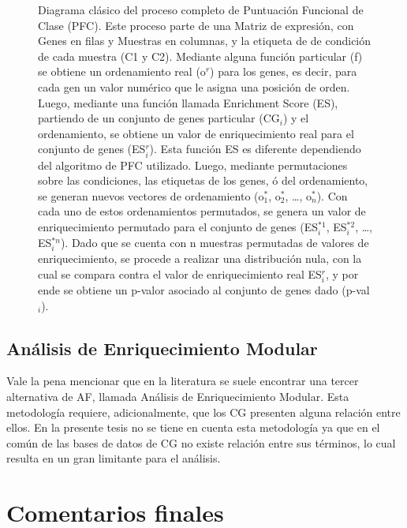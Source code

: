 \documentclass[12pt,twoside]{reedthesis}
\begin{document}
\begin{figure}
\caption{Diagrama clásico del proceso completo de Puntuación Funcional de Clase (PFC). Este proceso parte de una Matriz de expresión, con Genes en filas y Muestras en columnas, y la etiqueta de de condición de cada muestra (C1 y C2). Mediante alguna función particular (f) se obtiene un ordenamiento real (o\(^r\)) para los genes, es decir, para cada gen un valor numérico que le asigna una posición de orden. Luego, mediante una función llamada Enrichment Score (ES), partiendo de un conjunto de genes particular (CG\(_i\)) y el ordenamiento, se obtiene un valor de enriquecimiento real para el conjunto de genes (ES\(^r_i\)). Esta función ES es diferente dependiendo del algoritmo de PFC utilizado. Luego, mediante permutaciones sobre las condiciones, las etiquetas de los genes, ó del ordenamiento, se generan nuevos vectores de ordenamiento (o\(^*_1\), o\(^*_2\), \ldots{}, o\(^*_n\)). Con cada uno de estos ordenamientos permutados, se genera un valor de enriquecimiento permutado para el conjunto de genes (ES\(^{*1}_i\), ES\(^{*2}_i\), \ldots{}, ES\(^{*n}_i\)). Dado que se cuenta con n muestras permutadas de valores de enriquecimiento, se procede a realizar una distribución nula, con la cual se compara contra el valor de enriquecimiento real ES\(^r_i\), y por ende se obtiene un p-valor asociado al conjunto de genes dado (p-val\(_i\)).}\label{fig:diagramaFCS}
\end{figure}


\hypertarget{anuxe1lisis-de-enriquecimiento-modular}{%
\subsection{Análisis de Enriquecimiento Modular}\label{anuxe1lisis-de-enriquecimiento-modular}}

Vale la pena mencionar que en la literatura se suele encontrar una tercer alternativa de AF, llamada Análisis de Enriquecimiento Modular. Esta metodología requiere, adicionalmente, que los CG presenten alguna relación entre ellos. En la presente tesis no se tiene en cuenta esta metodología ya que en el común de las bases de datos de CG no existe relación entre sus términos, lo cual resulta en un gran limitante para el análisis.

\hypertarget{comentarios-finales}{%
\section{Comentarios finales}\label{comentarios-finales}}
\end{document}
